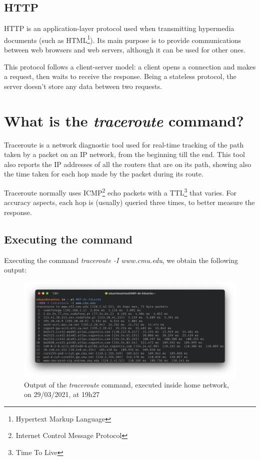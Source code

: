 \documentclass{article}
\newcommand\tab[1][1cm]{\hspace*{#1}}
\begin{document}
\subsection{HTTP}

\tab HTTP is an application-layer protocol used when transmitting hypermedia documents (such as HTML\footnote{Hypertext Markup Language}). Its main purpose is to provide communications between web browsers and web servers, although it can be used for other ones. 

This protocol follows a client-server model: a client opens a connection and makes a request, then waits to receive the response. Being a stateless protocol, the server doesn't store any data between two requests.

\section{What is the \textit{traceroute} command?}

\tab Traceroute is a network diagnostic tool used for real-time tracking of the path taken by a packet on an IP network, from the beginning till the end. This tool also reports the IP addresses of all the routers that are on its path, showing also the time taken for each hop made by the packet during its route.

Traceroute normally uses ICMP\footnote{Internet Control Message Protocol} echo packets with a TTL\footnote{Time To Live} that varies. For accuracy aspects, each hop is (usually) queried three times, to better measure the response. 

\newpage

\subsection{Executing the command}

\tab Executing the command \textit{traceroute -I www.cmu.edu}, we obtain the following output:

\begin{figure}[H]
    \includegraphics[width=1 \textwidth]{images/tracerouteHome.png}
    \caption{Output of the \textit{traceroute} command, executed inside home network, on 29/03/2021, at 19h27}
\end{figure}
\end{document}

